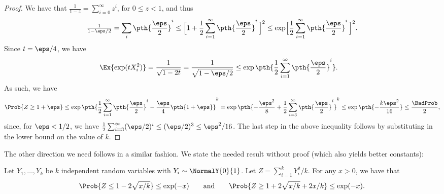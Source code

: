 \begin{proof}
    We have that $\frac{1}{1-z} = \sum_{i=0}^\infty z^i$, for
    $0 \leq z < 1$, and thus
    \begin{equation*}
        \tfrac{1}{{1-\eps/2}} %
        =%
        \sum_i \pth{\frac{\eps}{2}}^i%
        \leq%
        \Bigl[{1 + \frac{1}{2}\sum_{i=1}^\infty
           \pth{\frac{\eps}{2}}^{i}}\,\Bigr]^2%
        \leq%
        \exp\Bigl[{\frac{1}{2}\sum_{i=1}^\infty
           \pth{\frac{\eps}{2}}^{i}}\,\Bigr]^2.
    \end{equation*}
    Since $t=\eps/4$, we have
    \begin{align*}
      \Ex{\exp( tX_i^2) }%
      &=%
        \frac{1}{\sqrt{1-2t}}%
        =%
        \frac{1}{\sqrt{1-\eps/2}}
      \leq
      \exp\pth{\frac{1}{2}\sum_{i=1}^\infty
      \pth{\frac{\eps}{2}}^{i}}.%
    \end{align*}
    As such, we have
    \begin{equation*}
        \Prob{Z \geq 1+\eps}%
        \leq%
        \exp\pth{\frac{1}{2}\sum_{i=1}^\infty
           \pth{\frac{\eps}{2}}^{i}
           -
           \frac{\eps}{4} \pth{1+\eps} }^k
        =%
        \exp\pth{
           -\frac{\eps^2}{8} + 
           \frac{1}{2}\sum_{i=3}^\infty
           \pth{\frac{\eps}{2}}^{i}
        }^k
        \leq%
        \exp\pth{-\frac{k \eps^2}{16}}
        \leq %
        \frac{\BadProb}{2},
    \end{equation*}
    since, for $\eps < 1/2$, we have
    $\frac{1}{2}\sum_{i=3}^\infty (\eps/ 2)^{i}\leq (\eps/2)^3 \leq
    {\eps^2}/{16}$. The last step in the above inequality follows by
    substituting in the lower bound on the value of $k$.
\end{proof}

The other direction we need follows in a similar fashion. We state the
needed result without proof \cite[Lemma 1]{lm-aeqfm-00} (which also
yields better constants):

\begin{lemma}
    Let $Y_1, \ldots, Y_k$ be $k$ independent random variables with
    $Y_i \sim \NormalY{0}{1}$. Let $Z = \sum_{i=1}^k Y_i^2/k$. For any
    $x >0$, we have that
    \begin{equation*}
        \Prob{Z  \leq 1 -2 \sqrt{ x/k}} \leq \exp(-x)%
        \qquad\text{and}\qquad 
        \Prob{Z  \geq 1 + 2 \sqrt{ x/k} + 2x/k} \leq \exp(-x).%
    \end{equation*}   
\end{lemma}

